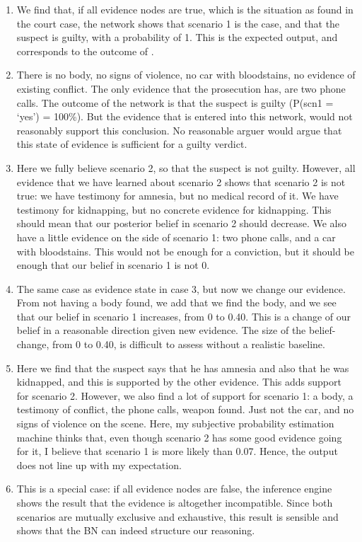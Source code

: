 \documentclass[12pt]{article}
\begin{document}
\begin{enumerate}
\item We find that, if all evidence nodes are true, which is the situation as found in the court case, the network shows that scenario 1 is the case, and that the suspect is guilty, with a probability of 1. This is the expected output, and corresponds to the outcome of \citet{vanLeeuwen2019}.
\item There is no body, no signs of violence, no car with bloodstains, no evidence of existing conflict. The only evidence that the prosecution has, are two phone calls. The outcome of the network is that the suspect is guilty (P(scn1 = `yes') = 100\%). But the evidence that is entered into this network, would not reasonably support this conclusion. No reasonable arguer would argue that this state of evidence is sufficient for a guilty verdict.
\item Here we fully believe scenario 2, so that the suspect is not guilty. However, all evidence that we have learned about scenario 2 shows that scenario 2 is not true: we have testimony for amnesia, but no medical record of it. We have testimony for kidnapping, but no concrete evidence for kidnapping. This should mean that our posterior belief in scenario 2 should decrease. We also have a little evidence on the side of scenario 1: two phone calls, and a car with bloodstains. This would not be enough for a conviction, but it should be enough that our belief in scenario 1 is not 0.
\item The same case as evidence state in case 3, but now we change our evidence. From not having a body found, we add that we find the body, and we see that our belief in scenario 1 increases, from 0 to 0.40. This is a change of our belief in a reasonable direction given new evidence. The size of the belief-change, from 0 to 0.40, is difficult to assess without a realistic baseline.
\item Here we find that the suspect says that he has amnesia and also that he was kidnapped, and this is supported by the other evidence. This adds support for scenario 2. However, we also find a lot of support for scenario 1: a body, a testimony of conflict, the phone calls, weapon found. Just not the car, and no signs of violence on the scene. Here, my subjective probability estimation machine thinks that, even though scenario 2 has some good evidence going for it, I believe that scenario 1 is more likely than 0.07. Hence, the output does not line up with my expectation.
\item This is a special case: if all evidence nodes are false, the inference engine shows the result that the evidence is altogether incompatible. Since both scenarios are mutually exclusive and exhaustive, this result is sensible and shows that the BN can indeed structure our reasoning.
\end{enumerate}
\end{document}
